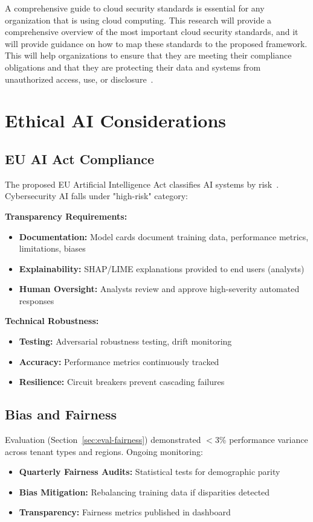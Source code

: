 A comprehensive guide to cloud security standards is essential for any organization that is using cloud computing. This research will provide a comprehensive overview of the most important cloud security standards, and it will provide guidance on how to map these standards to the proposed framework. This will help organizations to ensure that they are meeting their compliance obligations and that they are protecting their data and systems from unauthorized access, use, or disclosure~\cite{checkpoint2024standards}.

\section{Ethical AI Considerations}\label{sec:policy-ethicalai}
\subsection{EU AI Act Compliance}
The proposed EU Artificial Intelligence Act classifies AI systems by risk~\cite{euaiact2023}. Cybersecurity AI falls under "high-risk" category:

\textbf{Transparency Requirements:}
\begin{itemize}
    \item \textbf{Documentation:} Model cards document training data, performance metrics, limitations, biases
    \item \textbf{Explainability:} SHAP/LIME explanations provided to end users (analysts)
    \item \textbf{Human Oversight:} Analysts review and approve high-severity automated responses
\end{itemize}

\textbf{Technical Robustness:}
\begin{itemize}
    \item \textbf{Testing:} Adversarial robustness testing, drift monitoring
    \item \textbf{Accuracy:} Performance metrics continuously tracked
    \item \textbf{Resilience:} Circuit breakers prevent cascading failures
\end{itemize}

\subsection{Bias and Fairness}
Evaluation (Section~\ref{sec:eval-fairness}) demonstrated $<$3\% performance variance across tenant types and regions. Ongoing monitoring:
\begin{itemize}
    \item \textbf{Quarterly Fairness Audits:} Statistical tests for demographic parity
    \item \textbf{Bias Mitigation:} Rebalancing training data if disparities detected
    \item \textbf{Transparency:} Fairness metrics published in dashboard
\end{itemize}

